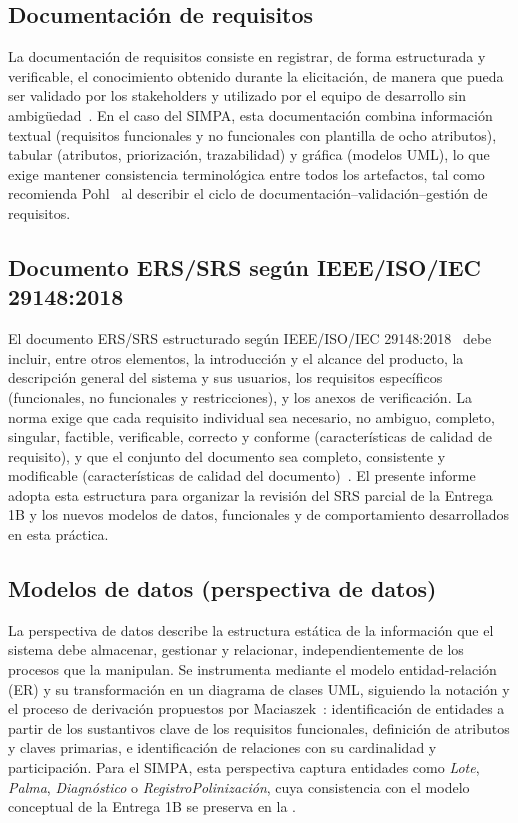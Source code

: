 \documentclass[11pt,a4paper]{report}
\begin{document}
\subsection{Documentación de requisitos}

La documentación de requisitos consiste en registrar, de forma estructurada y verificable, el
conocimiento obtenido durante la elicitación, de manera que pueda ser validado por los stakeholders y
utilizado por el equipo de desarrollo sin ambigüedad~\cite{ieee29148,swebok2024}. En el caso del SIMPA,
esta documentación combina información textual (requisitos funcionales y no funcionales con
plantilla de ocho atributos), tabular (atributos, priorización, trazabilidad) y gráfica (modelos UML),
lo que exige mantener consistencia terminológica entre todos los artefactos, tal como recomienda
Pohl~\cite{pohl2025} al describir el ciclo de documentación--validación--gestión de requisitos.

\subsection{Documento ERS/SRS según IEEE/ISO/IEC 29148:2018}

El documento ERS/SRS estructurado según IEEE/ISO/IEC 29148:2018~\cite{ieee29148} debe incluir, entre
otros elementos, la introducción y el alcance del producto, la descripción general del sistema y sus
usuarios, los requisitos específicos (funcionales, no funcionales y restricciones), y los anexos de
verificación. La norma exige que cada requisito individual sea necesario, no ambiguo, completo,
singular, factible, verificable, correcto y conforme (características de calidad de requisito), y que
el conjunto del documento sea completo, consistente y modificable (características de calidad del
documento)~\cite{ieee29148,iso25010}. El presente informe adopta esta estructura para organizar la
revisión del SRS parcial de la Entrega 1B y los nuevos modelos de datos, funcionales y de
comportamiento desarrollados en esta práctica.

\subsection{Modelos de datos (perspectiva de datos)}

La perspectiva de datos describe la estructura estática de la información que el sistema debe
almacenar, gestionar y relacionar, independientemente de los procesos que la manipulan. Se instrumenta
mediante el modelo entidad-relación (ER) y su transformación en un diagrama de clases UML, siguiendo
la notación y el proceso de derivación propuestos por Maciaszek~\cite{maciaszek2007}: identificación de
entidades a partir de los sustantivos clave de los requisitos funcionales, definición de atributos y
claves primarias, e identificación de relaciones con su cardinalidad y participación. Para el SIMPA,
esta perspectiva captura entidades como \textit{Lote}, \textit{Palma}, \textit{Diagnóstico} o
\textit{RegistroPolinización}, cuya consistencia con el modelo conceptual de la Entrega 1B se preserva
en la .
\end{document}
